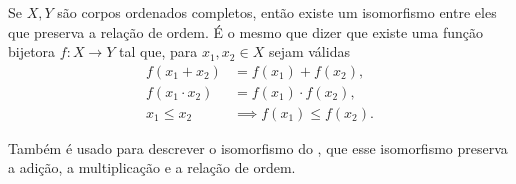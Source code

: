 \documentclass[../main.tex]{subfiles}
\begin{document}
\begin{teo}\label{enum-teo-RUnico}
    Se $X,Y$ são corpos ordenados completos, então existe um isomorfismo entre eles que preserva a relação de ordem. É o mesmo que dizer que existe uma função bijetora $f \colon X \to Y$ tal que, para $x_1,x_2 \in X$ sejam válidas
    \begin{align*}
         f(x_1 + x_2) &= f(x_1) + f(x_2) , \\
         f(x_1 \cdot x_2) &= f(x_1) \cdot f(x_2) , \\
         x_1 \leq x_2 &\implies f(x_1) \leq f(x_2).
    \end{align*}
\end{teo}
\begin{obs}
    Também é usado para descrever o isomorfismo do , que esse isomorfismo preserva a adição, a multiplicação e a relação de ordem.
\end{obs}
\end{document}
